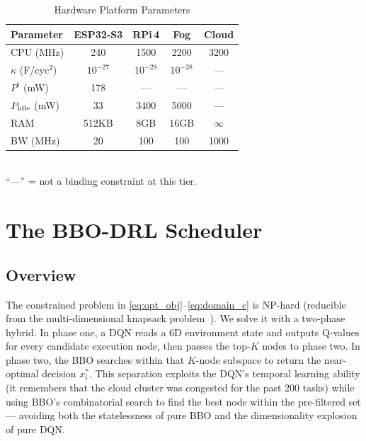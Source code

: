 \documentclass[journal]{IEEEtran}
\begin{document}
\begin{table}[t]
  \centering
  \caption{Hardware Platform Parameters}
  \label{tab:hardware}
  \renewcommand{\arraystretch}{1.2}
  \begin{tabular}{lcccc}
    \toprule
    \textbf{Parameter} &
    \textbf{ESP32-S3} &
    \textbf{RPi\,4} &
    \textbf{Fog} &
    \textbf{Cloud} \\
    \midrule
    CPU (MHz)         & 240    & 1500   & 2200   & 3200   \\
    $\kappa$ (F/cyc$^2$) & $10^{-27}$ & $10^{-28}$ & $10^{-28}$ & ---  \\
    $P^t$ (mW)        & 178    & ---    & ---    & ---    \\
    $P_{\rm idle}$ (mW) & 33   & 3400   & 5000   & ---    \\
    RAM               & 512KB  & 8GB    & 16GB   & $\infty$ \\
    BW (MHz)          & 20     & 100    & 100    & 1000   \\
    \bottomrule
  \end{tabular}\\[2pt]
  {\footnotesize ``---'' = not a binding constraint at this tier.}
\end{table}

\section{The BBO-DRL Scheduler}
\label{sec:bbodrl}

\subsection{Overview}

The constrained problem in \eqref{eq:opt_obj}--\eqref{eq:domain_c} is
NP-hard (reducible from the multi-dimensional knapsack
problem~\cite{kellerer2004knapsack}). We solve it with a two-phase
hybrid. In phase one, a DQN reads a 6D environment state and outputs
Q-values for every candidate execution node, then passes the top-$K$
nodes to phase two. In phase two, the BBO searches within that
$K$-node subspace to return the near-optimal decision $x_i^*$. This
separation exploits the DQN's temporal learning ability (it remembers
that the cloud cluster was congested for the past 200 tasks) while
using BBO's combinatorial search to find the best node within the
pre-filtered set — avoiding both the statelessness of pure BBO and the
dimensionality explosion of pure DQN.
\end{document}
